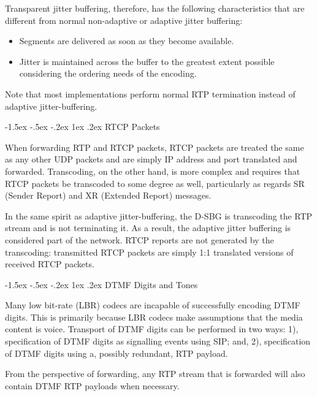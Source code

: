 \documentclass[letterpaper,final,notitlepage,twocolumn,10pt,twoside]{article}
\makeatletter
\let\normalsize = \small
\let\small = \footnotesize
\let\footnotesize = \scriptsize
\let\scriptsize = \tiny
\renewcommand\subsection{\@startsection{subsection}{2}{\z@}%
                                     {-1.5ex \@plus -.5ex \@minus -.2ex}%
                                     {1ex \@plus .2ex}%
                                     {\normalfont\normalsize\bfseries}}
\makeatother
\begin{document}
Transparent jitter buffering, therefore, has the following characteristics that
are different from normal non-adaptive or adaptive jitter buffering:

\begin{itemize}

\item Segments are delivered as soon as they become available.

\item Jitter is maintained across the buffer to the greatest extent possible
considering the ordering needs of the encoding.

\end{itemize}

Note that most implementations perform normal RTP termination instead of
adaptive jitter-buffering.

\subsection{RTCP Packets}

When forwarding RTP and RTCP packets, RTCP packets are treated the same as any
other UDP packets and are simply IP address and port translated and forwarded.
Transcoding, on the other hand, is more complex and requires that RTCP packets
be transcoded to some degree as well, particularly as regards SR (Sender Report)
and XR (Extended Report) messages.

In the same spirit as adaptive jitter-buffering, the D-SBG is transcoding the
RTP stream and is not terminating it.  As a result, the adaptive jitter
buffering is considered part of the network.  RTCP reports are not generated
by the transcoding: transmitted RTCP packets are simply 1:1 translated
versions of received RTCP packets.

\subsection{DTMF Digits and Tones}

Many low bit-rate (LBR) codecs are incapable of successfully encoding DTMF
digits.  This is primarily because LBR codecs make assumptions that the media
content is voice.  Transport of DTMF digits can be performed in two ways: 1),
specification of DTMF digits as signalling events using SIP; and, 2),
specification of DTMF digits using a, possibly redundant, RTP payload.

From the perspective of forwarding, any RTP stream that is forwarded will also
contain DTMF RTP payloads when necessary.
\end{document}
